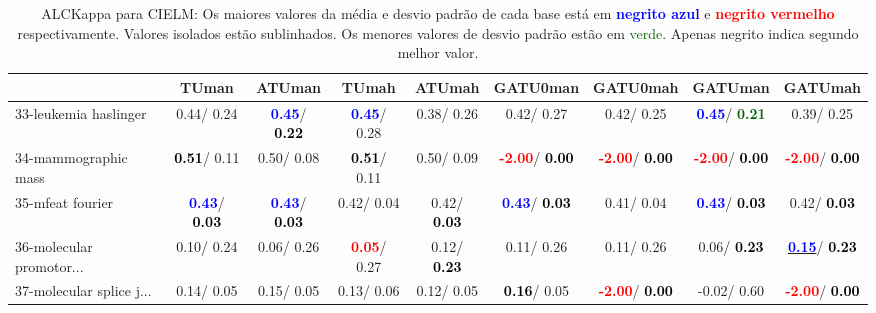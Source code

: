 \begin{table}[h]
\caption{ALCKappa para CIELM: Os maiores valores da média e desvio padrão de cada base está em \textcolor{blue}{\textbf{negrito azul}} e \textcolor{red}{\textbf{negrito vermelho}} respectivamente. Valores isolados estão sublinhados. Os menores valores de desvio padrão estão em \textcolor{darkgreen}{verde}. Apenas negrito indica segundo melhor valor.}
\begin{center}\begin{tabular}{lc|c|c|c|c|c|c|c}
 & TUman & \textbf{ATUman} & TUmah & \textbf{ATUmah} & GATU0man & GATU0mah & GATUman & GATUmah\\ \hline 33-leukemia haslinger &   0.44/  0.24 & \textcolor{blue}{\textbf{  0.45}}/\textcolor{black}{\textbf{  0.22}} & \textcolor{blue}{\textbf{  0.45}}/  0.28 &   0.38/  0.26 &   0.42/  0.27 &   0.42/  0.25 & \textcolor{blue}{\textbf{  0.45}}/\textcolor{darkgreen}{\textbf{  0.21}} &   0.39/  0.25 \\
34-mammographic mass & \textcolor{black}{\textbf{  0.51}}/  0.11 &   0.50/  0.08 & \textcolor{black}{\textbf{  0.51}}/  0.11 &   0.50/  0.09 & \textcolor{red}{\textbf{ -2.00}}/\textcolor{black}{\textbf{  0.00}} & \textcolor{red}{\textbf{ -2.00}}/\textcolor{black}{\textbf{  0.00}} & \textcolor{red}{\textbf{ -2.00}}/\textcolor{black}{\textbf{  0.00}} & \textcolor{red}{\textbf{ -2.00}}/\textcolor{black}{\textbf{  0.00}} \\
35-mfeat fourier & \textcolor{blue}{\textbf{  0.43}}/\textcolor{black}{\textbf{  0.03}} & \textcolor{blue}{\textbf{  0.43}}/\textcolor{black}{\textbf{  0.03}} &   0.42/  0.04 &   0.42/\textcolor{black}{\textbf{  0.03}} & \textcolor{blue}{\textbf{  0.43}}/\textcolor{black}{\textbf{  0.03}} &   0.41/  0.04 & \textcolor{blue}{\textbf{  0.43}}/\textcolor{black}{\textbf{  0.03}} &   0.42/\textcolor{black}{\textbf{  0.03}} \\
36-molecular promotor... &   0.10/  0.24 &   0.06/  0.26 & \textcolor{red}{\textbf{  0.05}}/  0.27 &   0.12/\textcolor{black}{\textbf{  0.23}} &   0.11/  0.26 &   0.11/  0.26 &   0.06/\textcolor{black}{\textbf{  0.23}} & \underline{\textcolor{blue}{\textbf{  0.15}}}/\textcolor{black}{\textbf{  0.23}} \\
37-molecular splice j... &   0.14/  0.05 &   0.15/  0.05 &   0.13/  0.06 &   0.12/  0.05 & \textcolor{black}{\textbf{  0.16}}/  0.05 & \textcolor{red}{\textbf{ -2.00}}/\textcolor{black}{\textbf{  0.00}} &  -0.02/  0.60 & \textcolor{red}{\textbf{ -2.00}}/\textcolor{black}{\textbf{  0.00}} \\

\end{tabular}
\end{center}
\end{table}
